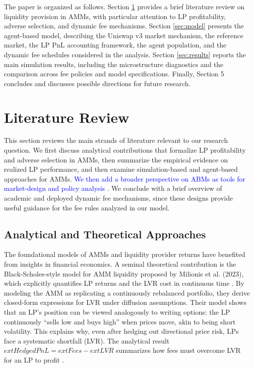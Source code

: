 \documentclass[11pt]{article}
\begin{document}
The paper is organized as follows. Section \ref{sec:literature_review} provides a brief literature review on liquidity provision in AMMs, with particular attention to LP profitability, adverse selection, and dynamic fee mechanisms. Section \ref{sec:model} presents the agent-based model, describing the Uniswap v3 market mechanism, the reference market, the LP PnL accounting framework, the agent population, and the dynamic fee schedules considered in the analysis. Section \ref{sec:results} reports the main simulation results, including the microstructure diagnostics and the comparison across fee policies and model specifications. Finally, Section 5 concludes and discusses possible directions for future research.

\section{Literature Review}
\label{sec:literature_review}
This section reviews the main strands of literature relevant to our research question. We first discuss analytical contributions that formalize LP profitability and adverse selection in AMMs, then summarize the empirical evidence on realized LP performance, and then examine simulation-based and agent-based approaches for AMMs. \textcolor{blue}{We then add a broader perspective on ABMs as tools for market-design and policy analysis \cite{raberto2001,chakraborti2011,mizuta2020}.} We conclude with a brief overview of academic and deployed dynamic fee mechanisms, since these designs provide useful guidance for the fee rules analyzed in our model.

\subsection{Analytical and Theoretical Approaches}
The foundational models of AMMs and liquidity provider returns have benefited from insights in financial economics. A seminal theoretical contribution is the Black-Scholes-style model for AMM liquidity proposed by Milionis et al. (2023), which explicitly quantifies LP returns and the LVR cost in continuous time \cite{milionis2023}. By modeling the AMM as replicating a continuously rebalanced portfolio, they derive closed-form expressions for LVR under diffusion assumptions. Their model shows that an LP's position can be viewed analogously to writing options: the LP continuously ``sells low and buys high'' when prices move, akin to being short volatility. This explains why, even after hedging out directional price risk, LPs face a systematic shortfall (LVR). The analytical result $ 	ext{Hedged PnL} = 	ext{Fees} - 	ext{LVR}$ summarizes how fees must overcome LVR for an LP to profit \cite{milionis2023}.
\end{document}
